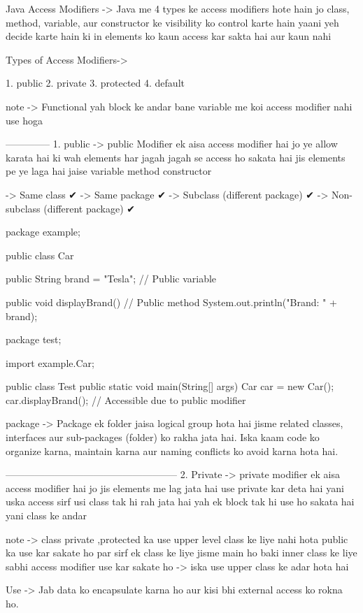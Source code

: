 Java Access Modifiers -> Java me 4 types ke access modifiers hote hain jo class, method, variable, aur constructor ke visibility ko control karte hain yaani yeh decide karte hain ki in elements ko kaun access kar sakta hai aur kaun nahi

Types of Access Modifiers->

1. public
2. private
3. protected
4. default  

note -> Functional yah block ke andar bane variable me koi access modifier nahi use hoga

--------------
1. public -> public Modifier ek aisa access modifier hai jo ye allow karata hai ki wah elements har jagah jagah se access ho sakata hai jis elements pe ye laga hai jaise variable method constructor 

-> Same class ✔
-> Same package ✔
-> Subclass (different package) ✔
-> Non-subclass (different package) ✔

package example;

public class Car {
    public String brand = "Tesla";  // Public variable

    public void displayBrand() {  // Public method
        System.out.println("Brand: " + brand);
    }
}


package test;

import example.Car;

public class Test {
    public static void main(String[] args) {
        Car car = new Car();
        car.displayBrand();  // Accessible due to public modifier
    }
}

package -> Package ek folder jaisa logical group hota hai jisme related classes, interfaces aur sub-packages (folder) ko rakha jata hai. Iska kaam code ko organize karna, maintain karna aur naming conflicts ko avoid karna hota hai.



-----------------------------------------------------
2. Private -> private modifier ek aisa access modifier hai jo jis elements me lag jata hai use private kar deta hai yani uska access sirf usi class tak hi rah jata hai yah ek block tak hi use ho sakata hai yani class ke andar 

note -> class private ,protected ka use upper level class ke liye nahi hota public ka use kar sakate ho par sirf ek class ke liye jisme main ho baki inner class ke liye sabhi access modifier use kar sakate ho
-> iska use upper class ke adar hota hai   


Use -> Jab data ko encapsulate karna ho aur kisi bhi external access ko rokna ho.


